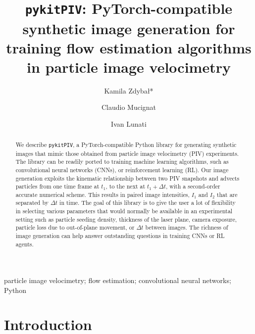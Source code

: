 \documentclass[a4paper,fleqn]{cas-dc}
\begin{document}


\title [mode = title]{\texttt{pykitPIV}: PyTorch-compatible synthetic image generation for training flow estimation algorithms in particle image velocimetry}

\author[EMPA]{Kamila Zdyba\l{}*}

\author[EMPA]{Claudio Mucignat}
\author[EMPA]{Ivan Lunati}

\address[EMPA]{Laboratory for Computational Engineering, Swiss Federal Laboratories for Materials Science and Technology, Empa, Dübendorf, Switzerland}

\begin{abstract} 
We describe \texttt{pykitPIV}, a PyTorch-compatible Python library for generating synthetic images that mimic those obtained from particle image velocimetry (PIV) experiments. The library can be readily ported to training machine learning algorithms, such as convolutional neural networks (CNNs), or reinforcement learning (RL). Our image generation exploits the kinematic relationship between two PIV snapshots and advects particles from one time frame at $t_1$, to the next at $t_1 + \Delta t$, with a second-order accurate numerical scheme. This results in paired image intensities, $I_1$ and $I_2$ that are separated by $\Delta t$ in time. The goal of this library is to give the user a lot of flexibility in selecting various parameters that would normally be available in an experimental setting such as particle seeding density, thickness of the laser plane, camera exposure, particle loss due to out-of-plane movement, or $\Delta t$ between images. The richness of image generation can help answer outstanding questions in training CNNs or RL agents.
\end{abstract}

\begin{keywords}
particle image velocimetry; flow estimation; convolutional neural networks; Python
\end{keywords}

\maketitle

\section{Introduction\label{sec:introduction}}
\end{document}

